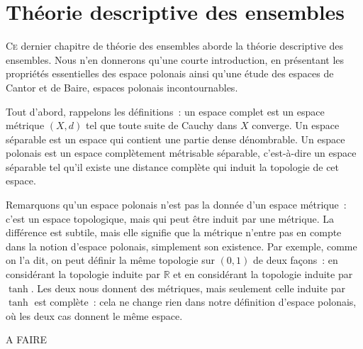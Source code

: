 \chapter{Théorie descriptive des ensembles}
\label{chp.desc}

\minitoc

\lettrine{C}{e} dernier chapitre de théorie des ensembles aborde la théorie
descriptive des ensembles. Nous n'en donnerons qu'une courte introduction, en
présentant les propriétés essentielles des espace polonais ainsi qu'une étude
des espaces de Cantor et de Baire, espaces polonais incontournables.

Tout d'abord, rappelons les définitions~: un espace complet est un espace
métrique $(X,d)$ tel que toute suite de Cauchy dans $X$ converge. Un espace
séparable est un espace qui contient une partie dense dénombrable. Un espace
polonais est un espace complètement métrisable séparable, c'est-à-dire un espace
séparable tel qu'il existe une distance complète qui induit la topologie de cet
espace.

Remarquons qu'un espace polonais n'est pas la donnée d'un espace métrique~:
c'est un espace topologique, mais qui peut être induit par une métrique. La
différence est subtile, mais elle signifie que la métrique n'entre pas en compte
dans la notion d'espace polonais, simplement son existence. Par exemple, comme
on l'a dit, on peut définir la même topologie sur $(0,1)$ de deux façons~: en
considérant la topologie induite par $\mathbb R$ et en considérant la topologie
induite par $\tanh$. Les deux nous donnent des métriques, mais seulement celle
induite par $\tanh$ est complète~: cela ne change rien dans notre définition
d'espace polonais, où les deux cas donnent le même espace.

A FAIRE

